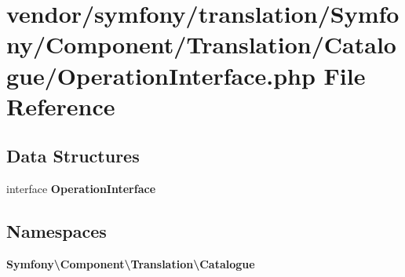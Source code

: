\section{vendor/symfony/translation/\+Symfony/\+Component/\+Translation/\+Catalogue/\+Operation\+Interface.php File Reference}
\label{_operation_interface_8php}
\subsection*{Data Structures}
\begin{DoxyCompactItemize}
\item 
interface {\bf Operation\+Interface}
\end{DoxyCompactItemize}
\subsection*{Namespaces}
\begin{DoxyCompactItemize}
\item 
 {\bf Symfony\textbackslash{}\+Component\textbackslash{}\+Translation\textbackslash{}\+Catalogue}
\end{DoxyCompactItemize}
